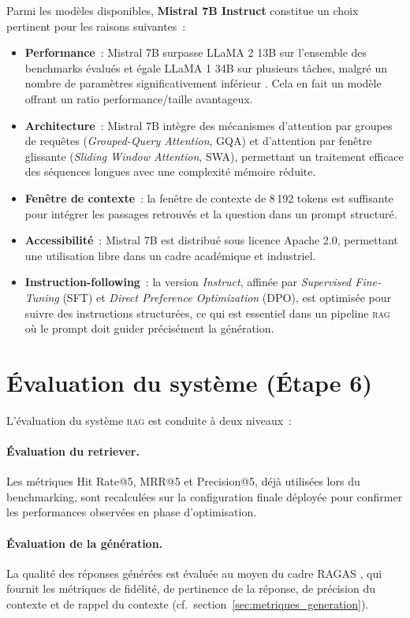 \documentclass[12pt,a4paper,oneside]{report}
\newcommand{\rag}{\textsc{rag}}
\begin{document}
Parmi les modèles disponibles, \textbf{Mistral 7B Instruct} \citep{jiang2023mistral} constitue un choix pertinent pour les raisons suivantes~:
\begin{itemize}
  \item \textbf{Performance}~: Mistral 7B surpasse LLaMA 2 13B sur l'ensemble des benchmarks évalués et égale LLaMA 1 34B sur plusieurs tâches, malgré un nombre de paramètres significativement inférieur \citep{jiang2023mistral}. Cela en fait un modèle offrant un ratio performance/taille avantageux.
  \item \textbf{Architecture}~: Mistral 7B intègre des mécanismes d'attention par groupes de requêtes (\textit{Grouped-Query Attention}, GQA) et d'attention par fenêtre glissante (\textit{Sliding Window Attention}, SWA), permettant un traitement efficace des séquences longues avec une complexité mémoire réduite.
  \item \textbf{Fenêtre de contexte}~: la fenêtre de contexte de 8\,192 tokens est suffisante pour intégrer les passages retrouvés et la question dans un prompt structuré.
  \item \textbf{Accessibilité}~: Mistral 7B est distribué sous licence Apache 2.0, permettant une utilisation libre dans un cadre académique et industriel.
  \item \textbf{Instruction-following}~: la version \textit{Instruct}, affinée par \textit{Supervised Fine-Tuning} (SFT) et \textit{Direct Preference Optimization} (DPO), est optimisée pour suivre des instructions structurées, ce qui est essentiel dans un pipeline \rag{} où le prompt doit guider précisément la génération.
\end{itemize}

\section{Évaluation du système (Étape 6)}
\label{sec:evaluation}

L'évaluation du système \rag{} est conduite à deux niveaux~:

\paragraph{Évaluation du retriever.} Les métriques Hit Rate@5, MRR@5 et Precision@5, déjà utilisées lors du benchmarking, sont recalculées sur la configuration finale déployée pour confirmer les performances observées en phase d'optimisation.

\paragraph{Évaluation de la génération.} La qualité des réponses générées est évaluée au moyen du cadre RAGAS \citep{es2024ragas}, qui fournit les métriques de fidélité, de pertinence de la réponse, de précision du contexte et de rappel du contexte (cf.\ section~\ref{sec:metriques_generation}).
\end{document}
